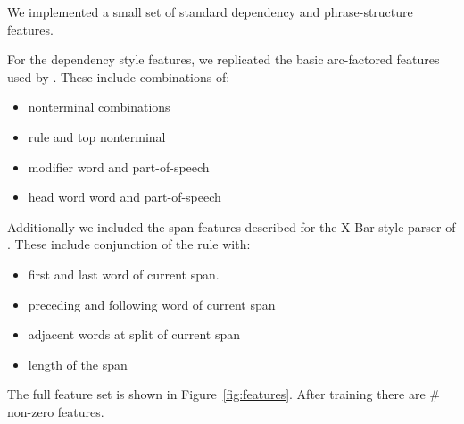 \documentclass[11pt,letterpaper]{article}
\newcommand{\Rule}[3]{#1 \rightarrow #2\ #3}
\begin{document}
We implemented a small set of standard dependency and phrase-structure features.

For the dependency style features, we replicated the basic arc-factored features
used by . These include combinations of:

\begin{itemize}
\item nonterminal combinations
\item rule and top nonterminal
\item modifier word and part-of-speech
\item head word word and part-of-speech
\end{itemize}

Additionally we included the span features described for the X-Bar style
parser of . These include conjunction of the rule
with:

\begin{itemize}
\item first and last word of current span.
\item preceding and following word of current span
\item adjacent words at split of current span
\item length of the span
\end{itemize}


The full feature set  is shown in Figure~\ref{fig:features}.
After training there are \# non-zero features.










\end{document}
